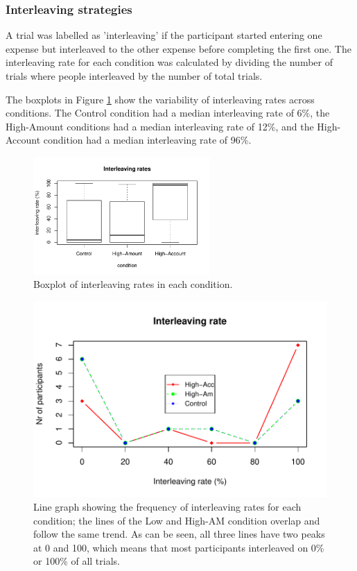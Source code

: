 \subsubsection{Interleaving strategies}
A trial was labelled as 'interleaving' if the participant started entering one expense but interleaved to the other expense before completing the first one. The interleaving rate for each condition was calculated by dividing the number of trials where people interleaved by the number of total trials.  

The boxplots in Figure \ref{fig:ch34_4-boxplots} show the variability of interleaving rates across conditions. The Control condition had a median interleaving rate of 6\%, the High-Amount conditions had a median interleaving rate of 12\%, and the High-Account condition had a median interleaving rate of 96\%.

\begin{figure}
 \includegraphics[width=0.6\textwidth]{images/ch34/ch4_4-boxplot.pdf}
\caption{Boxplot of interleaving rates in each condition.}
\label{fig:ch34_4-boxplots}
\end{figure}

\begin{figure}
 \includegraphics[width=\textwidth]{images/ch34/ch34-4_linechart.pdf}
\caption{Line graph showing the frequency of interleaving rates for each condition; the lines of the Low and High-AM condition overlap and follow the same trend. As can be seen, all three lines have two peaks at 0 and 100, which means that most participants interleaved on 0\% or 100\% of all trials.}
\label{fig:ch34_4-linechart}
\end{figure}

